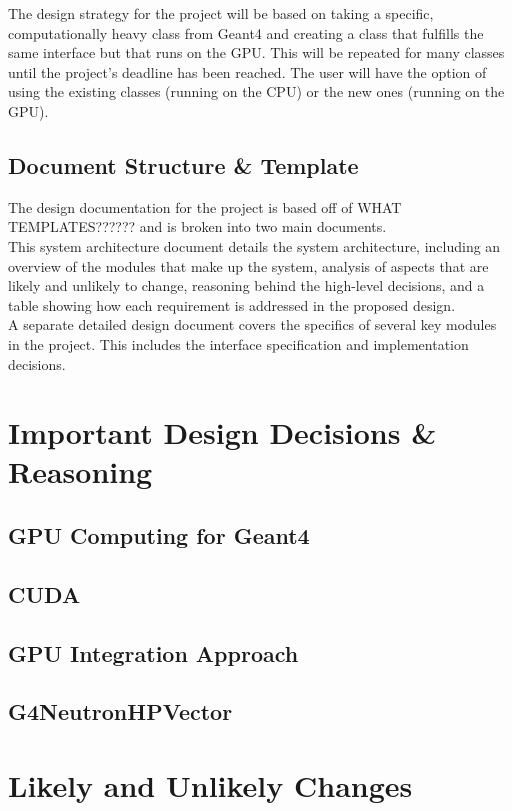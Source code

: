 \documentclass[12pt]{article}
\begin{document}
The design strategy for the project will be based on taking a specific, computationally heavy class from Geant4 and creating a class that fulfills the same interface but that runs on the GPU. This will be repeated for many classes until the project's deadline has been reached. The user will have the option of using the existing classes (running on the CPU) or the new ones (running on the GPU).

\subsection{Document Structure \& Template}
The design documentation for the project is based off of WHAT TEMPLATES?????? and is broken into two main documents.\\

This system architecture document details the system architecture, including an overview of the modules that make up the system, analysis of aspects that are likely and unlikely to change, reasoning behind the high-level decisions, and a table showing how each requirement is addressed in the proposed design.\\

A separate detailed design document covers the specifics of several key modules in the project. This includes the interface specification and implementation decisions.

\section{Important Design Decisions \& Reasoning}
\subsection{GPU Computing for Geant4}
\subsection{CUDA}
\subsection{GPU Integration Approach}
\subsection{G4NeutronHPVector}\label{subsec_G4NeutronHPVector}

\section{Likely and Unlikely Changes}
\end{document}
